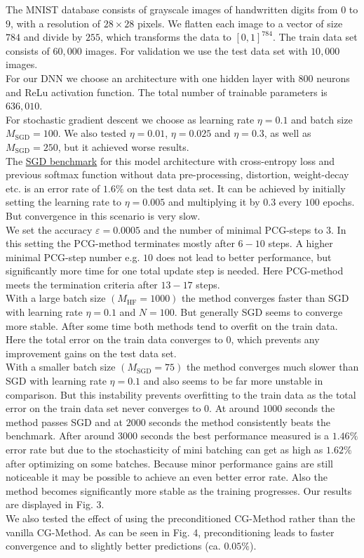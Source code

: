 \documentclass[conference]{IEEEtran}
\begin{document}
	\noindent
	The MNIST database consists of grayscale images of handwritten digits from $0$ to $9$, with a resolution of $28\times28$ pixels. We flatten each image to a vector of size $784$ and divide by $255$, which transforms the data to $[0,1]^{784}$. The train data set consists of $60,000$ images. For validation we use the test data set with $10,000$ images.\\
	For our DNN we choose an architecture with one hidden layer with $800$ neurons and ReLu activation function. The total number of trainable parameters is $636,010$.\\
	For stochastic gradient descent we choose as learning rate $\eta=0.1$ and batch size $M_{\mathrm{SGD}}=100$. We also tested $\eta=0.01$, $\eta=0.025$ and $\eta=0.3$, as well as $M_{\mathrm{SGD}}=250$, but it achieved worse results. \\
	The \href{https://en.wikipedia.org/wiki/MNIST_database}{SGD benchmark} for this model architecture with cross-entropy loss and previous softmax function without data pre-processing, distortion, weight-decay etc. is an error rate of $1.6\%$ on the test data set.
	It can be achieved by initially setting the learning rate to $\eta=0.005$ and multiplying it by $0.3$ every $100$ epochs. But convergence in this scenario is very slow.\\
	\noindent
	We set the accuracy $\varepsilon=0.0005$ and the number of minimal PCG-steps to $3$. In this setting the PCG-method terminates mostly after $6-10$ steps. A higher minimal PCG-step number e.g. $10$ does not lead to better performance, but significantly more time for one total update step is needed. Here PCG-method meets the termination criteria after $13-17$ steps.\\
	With a large batch size $(M_{\mathrm{HF}}=1000)$ the method converges faster than SGD with learning rate $\eta=0.1$ and $N=100.$ But generally SGD seems to converge more stable. After some time both methods tend to overfit on the train data. Here the total error on the train data converges to $0$, which prevents any improvement gains on the test data set.\\
	With a smaller batch size $(M_{\mathrm{SGD}}=75)$ the method converges much slower than SGD with learning rate $\eta=0.1$ and also seems to be far more unstable in comparison. But this instability prevents overfitting to the train data as the total error on the train data set never converges to $0$. At around $1000$ seconds the method passes SGD and at $2000$ seconds the method consistently beats the benchmark. After around $3000$ seconds the best performance measured is a $1.46\%$ error rate but due to the stochasticity of mini batching can get as high as $1.62\%$ after optimizing on some batches. Because minor performance gains are still noticeable it may be possible to achieve an even better error rate.
	Also the method becomes significantly more stable as the training progresses. Our results are displayed in Fig. 3.\\
	We also tested the effect of using the preconditioned CG-Method rather than the vanilla CG-Method.
	As can be seen in Fig. 4, preconditioning leads to faster convergence and to slightly better predictions (ca. $0.05\%$).
\end{document}
